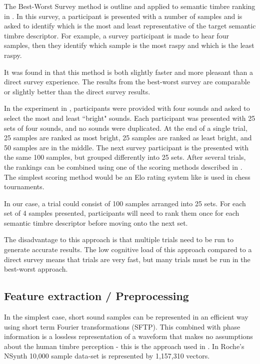 \documentclass{article}
\begin{document}
The Best-Worst Survey method is outline and applied to semantic timbre ranking in \cite{Victor2022}. In this survey, a participant is presented with a number of samples and is asked to identify which is the most and least representative of the target semantic timbre descriptor. For example, a survey participant is made to hear four samples, then they identify which sample is the most raspy and which is the least raspy.

It was found in \cite{Victor2022} that this method is both slightly faster and more pleasant than a direct survey experience. The results from the best-worst survey are comparable or slightly better than the direct survey results. 

In the experiment in \cite{Victor2022}, participants were provided with four sounds and asked to select the most and least ``bright" sounds. Each participant was presented with 25 sets of four sounds, and no sounds were duplicated. At the end of a single trial, 25 samples are ranked as most bright, 25 samples are ranked as least bright, and 50 samples are in the middle. The next survey participant is the presented with the same 100 samples, but grouped differently into 25 sets. After several trials, the rankings can be combined using one of the scoring methods described in \cite{Hollis2018}. The simplest scoring method would be an Elo rating system like is used in chess tournaments.

In our case, a trial could consist of 100 samples arranged into 25 sets. For each set of 4 samples presented, participants will need to rank them once for each semantic timbre descriptor before moving onto the next set.

The disadvantage to this approach is that multiple trials need to be run to generate accurate results. The low cognitive load of this approach compared to a direct survey means that trials are very fast, but many trials must be run in the best-worst approach.


\subsection{Feature extraction / Preprocessing}

In the simplest case, short sound samples can be represented in an efficient way using short term Fourier transformations (SFTP). This combined with phase information is a lossless representation of a waveform that makes no assumptions about the human timbre perception - this is the approach used in \cite{Roche2020}. In Roche's NSynth 10,000 sample data-set is represented by 1,157,310 vectors.
\end{document}
